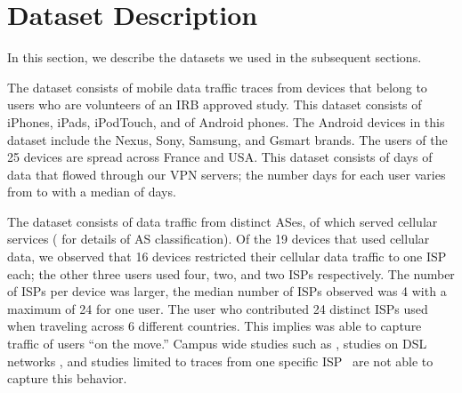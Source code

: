 \section{Dataset Description}
\label{sec:dataset}

In this section, we describe the datasets we used in the subsequent sections.


The \moball dataset consists of mobile data traffic traces from  devices that belong to  users who are volunteers of an IRB approved study. 
This dataset consists of  iPhones,  iPads,  iPodTouch, and  of Android phones.
The Android devices in this dataset include the Nexus, Sony, Samsung, and Gsmart brands. 
The users of the 25 devices are spread across France and USA. 
This dataset consists of  days of data that flowed through our VPN servers; the number days for each user varies from  to  with a median of  days.  

The \moball dataset consists of data traffic from \tbdv{} distinct ASes, of which \tbdv{} served cellular services ( for details of AS classification).
Of the 19 devices that used cellular data, we observed that 16 devices restricted their cellular data traffic to one ISP each; the other three users used four, two, and two ISPs respectively. 
The number of \wifi ISPs per device was larger, the median number of ISPs observed was 4 with a maximum of 24 for one user. 
The user who contributed 24 distinct ISPs used \platname when traveling across 6 different countries. 
This implies \platname was able to capture traffic of users ``on the move.''
Campus wide studies such as \tbd{}, studies on DSL networks \cite{maier:mobtraffic}, and studies limited to traces from one specific ISP~\cite{vallina-rod:ads} are not able to capture this behavior.

